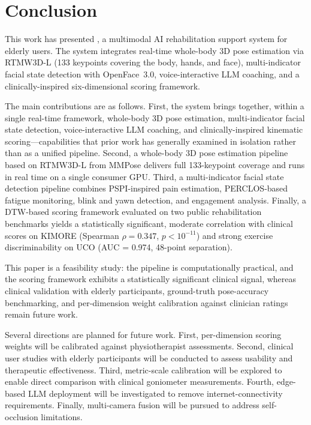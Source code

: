 \section{Conclusion}
\label{sec:conclusion}

This work has presented \system{}, a multimodal AI rehabilitation support system for elderly users. The system integrates real-time whole-body 3D pose estimation via RTMW3D-L (133 keypoints covering the body, hands, and face), multi-indicator facial state detection with OpenFace~3.0, voice-interactive LLM coaching, and a clinically-inspired six-dimensional scoring framework.

The main contributions are as follows. First, the system brings together, within a single real-time framework, whole-body 3D pose estimation, multi-indicator facial state detection, voice-interactive LLM coaching, and clinically-inspired kinematic scoring---capabilities that prior work has generally examined in isolation rather than as a unified pipeline. Second, a whole-body 3D pose estimation pipeline based on RTMW3D-L from MMPose delivers full 133-keypoint coverage and runs in real time on a single consumer GPU. Third, a multi-indicator facial state detection pipeline combines PSPI-inspired pain estimation, PERCLOS-based fatigue monitoring, blink and yawn detection, and engagement analysis. Finally, a DTW-based scoring framework evaluated on two public rehabilitation benchmarks yields a statistically significant, moderate correlation with clinical scores on KIMORE (Spearman $\rho = 0.347$, $p < 10^{-11}$) and strong exercise discriminability on UCO (AUC = 0.974, 48-point separation).

This paper is a feasibility study: the pipeline is computationally practical, and the scoring framework exhibits a statistically significant clinical signal, whereas clinical validation with elderly participants, ground-truth pose-accuracy benchmarking, and per-dimension weight calibration against clinician ratings remain future work.

Several directions are planned for future work. First, per-dimension scoring weights will be calibrated against physiotherapist assessments. Second, clinical user studies with elderly participants will be conducted to assess usability and therapeutic effectiveness. Third, metric-scale calibration will be explored to enable direct comparison with clinical goniometer measurements. Fourth, edge-based LLM deployment will be investigated to remove internet-connectivity requirements. Finally, multi-camera fusion will be pursued to address self-occlusion limitations.
